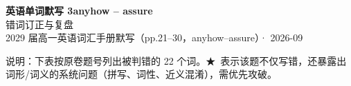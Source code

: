 \documentclass[11pt,a4paper]{article}
\newcommand{\STAR}{\textcolor{wrongred}{\starfont ★}}
\begin{document}
\begin{center}
{\LARGE\bfseries 英语单词默写 3\quad anyhow -- assure}\\[0.25em]
{\large 错词订正与复盘}\\[0.35em]
{\footnotesize 2029 届高一英语词汇手册默写（pp.21--30，anyhow--assure）· 2026-09}
\end{center}

\vspace{-0.2em}
\noindent{\color{rulegray}\rule{\textwidth}{0.8pt}}

\vspace{0.7em}
\noindent{}

\vspace{0.8em}
\noindent 说明：下表按原卷题号列出被判错的 22 个词。\STAR\ 表示该题不仅写错，还暴露出词形/词义的系统问题（拼写、词性、近义混淆），需优先攻破。
\end{document}
